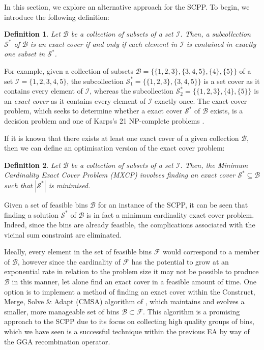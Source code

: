 \documentclass[a4paper,11pt,authoryear]{elsarticle}
\newtheorem{definition}{Definition}
\begin{document}
\noindent In this section, we explore an alternative approach for the SCPP. To begin, we introduce the following definition:

\begin{definition}
	Let $\mathcal{B}$ be a collection of subsets of a set $\mathcal{I}$. Then, a subcollection $\mathcal{S}^*$ of $\mathcal{B}$ is an \emph{exact cover} if and only if each element in $\mathcal{I}$ is contained in exactly one subset in $\mathcal{S}^*$.
	\label{defn:exactcover}
\end{definition}	

\noindent For example, given a collection of subsets $\mathcal{B} = \{\{1,2,3\}, \{3,4,5\}, \{4\}, \{5\}\}$ of a set $\mathcal{I} = \{1,2,3,4,5\}$, the subcollection $\mathcal{S}^*_1 = \{\{1,2,3\}, \{3,4,5\}\}$ is a set cover as it contains every element of $\mathcal{I}$, whereas the subcollection $\mathcal{S}^*_2 = \{\{1,2,3\}, \{4\}, \{5\}\}$ is an \emph{exact cover} as it contains every element of $\mathcal{I}$ exactly once. The exact cover problem, which seeks to determine whether a exact cover $\mathcal{S}^*$ of $\mathcal{B}$ exists, is a decision problem and one of Karps's 21 NP-complete problems \citep{karp1972}.

If it is known that there exists at least one exact cover of a given collection $\mathcal{B}$, then we can define an optimisation version of the exact cover problem:

\begin{definition}
	Let $\mathcal{B}$ be a collection of subsets of a set $\mathcal{I}$. Then, the \emph{Minimum Cardinality Exact Cover Problem (MXCP)} involves finding an exact cover $\mathcal{S}^* \subseteq \mathcal{B}$ such that $|\mathcal{S}^*|$ is minimised. 
	\label{defn:mxcp}
\end{definition}	

\noindent Given a set of feasible bins $\mathcal{B}$ for an instance of the SCPP, it can be seen that finding a solution $\mathcal{S}^*$ of $\mathcal{B}$ is in fact a minimum cardinality exact cover problem. Indeed, since the bins are already feasible, the complications associated with the vicinal sum constraint are eliminated.

Ideally, every element in the set of feasible bins $\mathcal{F}$ would correspond to a member of $\mathcal{B}$, however since the cardinality of $\mathcal{F}$ has the potential to grow at an exponential rate in relation to the problem size it may not be possible to produce $\mathcal{B}$ in this manner, let alone find an exact cover in a feasible amount of time. One option is to implement a method of finding an exact cover within the Construct, Merge, Solve $\&$ Adapt (CMSA) algorithm of \cite{blum2016}, which maintains and evolves a smaller, more manageable set of bins $\mathcal{B} \subset \mathcal{F}$. This algorithm is a promising approach to the SCPP due to its focus on collecting high quality groups of bins, which we have seen is a successful technique within the previous EA by way of the GGA recombination operator.
\end{document}
